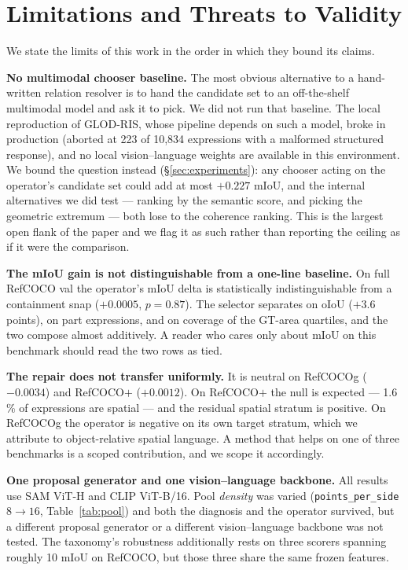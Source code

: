 \section{Limitations and Threats to Validity}
\label{sec:limitations}

We state the limits of this work in the order in which they bound its claims.

\textbf{No multimodal chooser baseline.} The most obvious alternative to a
hand-written relation resolver is to hand the candidate set to an
off-the-shelf multimodal model and ask it to pick. We did not run that
baseline. The local reproduction of GLOD-RIS, whose pipeline depends on such a
model, broke in production (aborted at 223 of 10{,}834 expressions with a
malformed structured response), and no local vision--language weights are
available in this environment. We bound the question instead
(§\ref{sec:experiments}): any chooser acting on the operator's candidate set
could add at most $+0.227$ mIoU, and the internal alternatives we did test ---
ranking by the semantic score, and picking the geometric extremum --- both lose
to the coherence ranking. This is the largest open flank of the paper and we
flag it as such rather than reporting the ceiling as if it were the comparison.

\textbf{The mIoU gain is not distinguishable from a one-line baseline.} On
full RefCOCO val the operator's mIoU delta is statistically indistinguishable
from a containment snap ($+0.0005$, $p=0.87$). The selector separates on oIoU
($+3.6$ points), on part expressions, and on coverage of the GT-area quartiles,
and the two compose almost additively. A reader who cares only about mIoU on
this benchmark should read the two rows as tied.

\textbf{The repair does not transfer uniformly.} It is neutral on RefCOCOg
($-0.0034$) and RefCOCO$+$ ($+0.0012$). On RefCOCO$+$ the null is expected ---
1.6\,\% of expressions are spatial --- and the residual spatial stratum is
positive. On RefCOCOg the operator is negative on its own target stratum, which
we attribute to object-relative spatial language. A method that helps on one of
three benchmarks is a scoped contribution, and we scope it accordingly.

\textbf{One proposal generator and one vision--language backbone.} All results
use SAM ViT-H and CLIP ViT-B/16. Pool \emph{density} was varied
(\texttt{points\_per\_side} $8\rightarrow16$, Table~\ref{tab:pool}) and both
the diagnosis and the operator survived, but a different proposal generator or
a different vision--language backbone was not tested. The taxonomy's robustness
additionally rests on three scorers spanning roughly 10 mIoU on RefCOCO, but
those three share the same frozen features.

